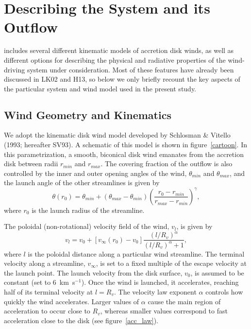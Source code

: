 \documentclass[preprint, a4paper, 11pt]{aastex}
\begin{document}
\section{Describing the System and its Outflow}

\py includes several different kinematic models of accretion disk
winds, as well as different options for describing the physical and
radiative properties of the wind-driving system under
consideration. Most of these features have already been discussed in
LK02 and H13, so below we only briefly recount the key aspects of the
particular system and wind model used in the present study.

\subsection{Wind Geometry and Kinematics}

We adopt the kinematic disk wind model developed by Schlosman \&
Vitello (1993; hereafter SV93). A schematic of this model is shown in
figure~\ref{cartoon}. In this parametrization, a smooth, biconical
disk wind emanates from the accretion disk between radii $r_{min}$ and 
$r_{max}$. The covering fraction of the outflow is also controlled by the
inner and outer opening angles of the wind, $\theta_{min}$ and
$\theta_{max}$, and the launch angle of the other streamlines is given
by 
\begin{equation}
\theta(r_0) = \theta_{min} + (\theta_{max} - \theta_{min}) \left(\frac{r_0 - r_{min}}{r_{max} - r_{min}} \right)^{\gamma},
\label{theta}
\end{equation}
where $r_0$ is the launch radius of the streamline.

The poloidal (non-rotational) velocity field of the wind, $v_l$, is given by
\begin{equation}
v_l=v_0+\left[v_{\infty}(r_0)-v_0\right]\frac{\left(l/R_v\right)^{\alpha}}{\left(l/R_v\right)^{\alpha}+1},
\label{v_law}
\end{equation}
where $l$ is the poloidal distance along a particular wind
streamline. The terminal velocity along a streamline, $v_{\infty}$, is
set to a fixed multiple of the escape velocity at the launch
point. The launch velocity from the disk surface, $v_0$, is assumed to
be constant (set to $6$~km~s$^{-1}$). Once the wind is launched, it
accelerates, reaching half of its terminal velocity at $l = R_v$. The
velocity law exponent $\alpha$ controls how quickly the wind
accelerates. Larger values of $\alpha$ cause the main region of 
acceleration to occur close to $R_v$, whereas smaller values
correspond to fast acceleration close to the disk (see
figure~\ref{acc_law}). 
\end{document}
